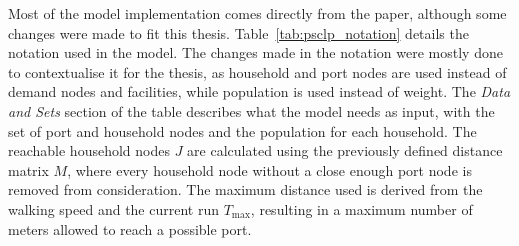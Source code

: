 \documentclass[12pt]{article}
\begin{document}
Most of the model implementation comes directly from the \cite{psclp} paper, although some changes were made to fit this thesis. Table~\ref{tab:psclp_notation} details the notation used in the model. The changes made in the notation were mostly done to contextualise it for the thesis, as household and port nodes are used instead of demand nodes and facilities, while population is used instead of weight. The \textit{Data and Sets} section of the table describes what the model needs as input, with the set of port and household nodes and the population for each household. The reachable household nodes \(J\) are calculated using the previously defined distance matrix \(M\), where every household node without a close enough port node is removed from consideration. The maximum distance used is derived from the walking speed and the current run \(T_{\max}\), resulting in a maximum number of meters allowed to reach a possible port.
\end{document}
